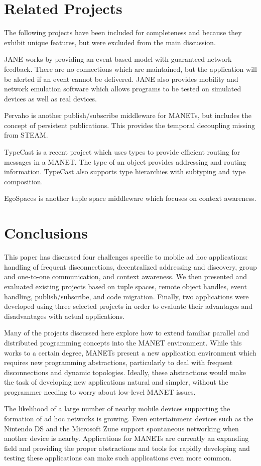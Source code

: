 \documentclass{sig-alternate}
\begin{document}
\section{Related Projects}

The following projects have been included for completeness and because they exhibit unique features, but were excluded from the main discussion.

JANE\cite{jane} works by providing an event-based model with guaranteed network feedback. There are no connections which are maintained, but the application will be alerted if an event cannot be delivered. JANE also provides mobility and network emulation software which allows programs to be tested on simulated devices as well as real devices.

Pervaho\cite{pervaho} is another publish/subscribe middleware for MANETs, but includes the concept of persistent publications. This provides the temporal decoupling missing from STEAM.

TypeCast\cite{typecast} is a recent project which uses types to provide efficient routing for messages in a MANET. The type of an object provides addressing and routing information. TypeCast also supports type hierarchies with subtyping and type composition.

EgoSpaces\cite{EgoSpaces} is another tuple space middleware which focuses on context awareness.
\section{Conclusions}

This paper has discussed four challenges specific to mobile ad hoc applications: handling of frequent disconnections, decentralized addressing and discovery, group and one-to-one communication, and context awareness. We then presented and evaluated existing projects based on tuple spaces, remote object handles, event handling, publish/subscribe, and code migration. Finally, two applications were developed using three selected projects in order to evaluate their advantages and disadvantages with actual applications.

Many of the projects discussed here explore how to extend familiar parallel and distributed programming concepts into the MANET environment. While this works to a certain degree, MANETs present a new application environment which requires new programming abstractions, particularly to deal with frequent disconnections and dynamic topologies. Ideally, these abstractions would make the task of developing new applications natural and simpler, without the programmer needing to worry about low-level MANET issues.

The likelihood of a large number of nearby mobile devices supporting the formation of ad hoc networks is growing. Even entertainment devices such as the Nintendo DS and the Microsoft Zune support spontaneous networking when another device is nearby. Applications for MANETs are currently an expanding field and providing the proper abstractions and tools for rapidly developing and testing these applications can make such applications even more common.



\end{document}
